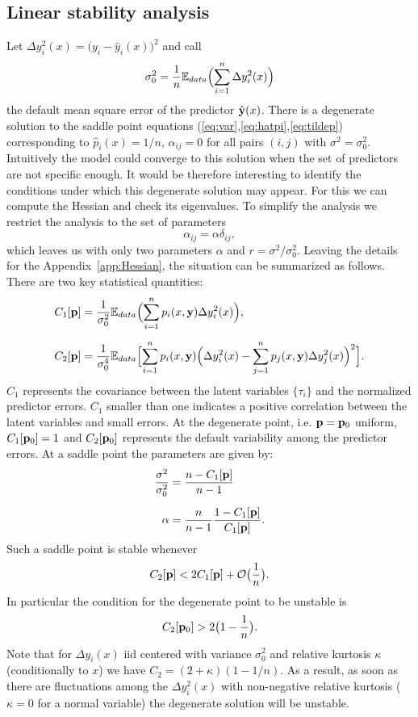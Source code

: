 \documentclass[envcountsect,runningheads]{llncs}
\theoremstyle{etoile}
\begin{document}
\subsection{Linear stability analysis}\label{sec:stability}
Let $\Delta y_i^2(x)= \bigl(y_i-\hat y_i(x)\bigr)^2$ and call
\[
\sigma_0^2 = \frac{1}{n}{\mathbb E}_{data}\Bigl(\sum_{i=1}^n \Delta y_i^2(x)\Bigr)
\]
the default mean square error of the predictor ${\hat {\bf y}}(x)$.
There is a degenerate solution to the saddle point equations (\ref{eq:var},\ref{eq:hatpi},\ref{eq:tildep}) corresponding to $\hat p_i(x) = 1/n$, $\alpha_{ij}=0$ for all
pairs $(i,j)$ with $\sigma^2=\sigma_0^2$. Intuitively the model could converge to this solution when the set of predictors are not specific enough.
It would be therefore interesting to identify the conditions under which this degenerate solution may appear. For this we can compute the Hessian and check its eigenvalues.
To simplify the analysis
we restrict the analysis to the set of parameters
\[
\alpha_{ij} = \alpha \delta_{ij},
\]
which leaves us with only two parameters $\alpha$ and $r = \sigma^2/\sigma_0^2$. Leaving the details for the Appendix~\ref{app:Hessian},
the situation can be summarized as follows. There are two key statistical quantities:
\begin{align}
C_1[{\bf p}] &= \frac{1}{\sigma_0^2}{\mathbb E}_{data}\Bigl(\sum_{i=1}^n p_i(x,{\bf y})\Delta y_i^2(x)\Bigr),\label{def:C1}\\[0.2cm]
C_2[{\bf p}] &= \frac{1}{\sigma_0^4}{\mathbb E}_{data}\Bigl[\sum_{i=1}^n p_i(x,{\bf y})\Bigl(\Delta y_i^2(x)-\sum_{j=1}^np_j(x,{\bf y})\Delta y_j^2(x)\Bigr)^2\Bigr].\label{def:C2}
\end{align}
$C_1$ represents the covariance between the latent variables $\{\tau_i\}$ and the normalized predictor errors. $C_1$ smaller than one 
indicates a positive correlation between the latent variables and small errors. At the degenerate point, i.e. ${\bf p}={\bf p}_{0}$ uniform, $C_1[{\bf p}_{0}]=1$ and $C_2[{\bf p}_{0}]$
represents the default variability among the predictor errors.
At a saddle point the parameters are given by:
\begin{align*}
\frac{\sigma^2}{\sigma_0^2} &= \frac{n-C_1[{\bf p}]}{n-1} \\[0.2cm]
\alpha &= \frac{n}{n-1}\frac{1-C_1[{\bf p}]}{C_1[{\bf p}]}.
\end{align*}
Such a saddle point is stable whenever
\[
C_2[{\bf p}] < 2C_1[{\bf p}]+{\cal O}\bigl(\frac{1}{n}\bigr).
\]
In particular the condition for the degenerate point to be unstable is
\[
C_2[{\bf p}_0] > 2\bigl(1-\frac{1}{n}\bigr).
\]
Note that for $\Delta y_i(x)$ iid centered with variance $\sigma_0^2$ and relative kurtosis $\kappa$ (conditionally to $x$)
we have $C_2 = (2+\kappa)(1-1/n)$. As a result, as soon as there are fluctuations among the $\Delta y_i^2(x)$ with non-negative relative kurtosis ($\kappa=0$ for a normal variable)
the  degenerate solution will be unstable.
\end{document}

